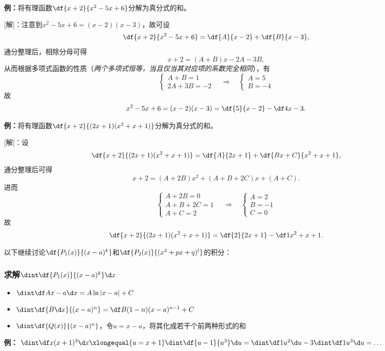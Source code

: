 {\bf 例：}将有理函数$\df{x+2}{x^2-5x+6}$分解为真分式的和。

[解]：注意到$x^2-5x+6=(x-2)(x-3)$，故可设
$$\df{x+2}{x^2-5x+6}=\df{A}{x-2}+\df{B}{x-3},$$
通分整理后，相除分母可得
$$x+2=(A+B)x-2A-3B,$$
从而根据多项式函数的性质（{\it 两个多项式恒等，当且仅当其对应项的系数完全相同}），有
$$
	\left\{\begin{array}{l}
		A+B=1\\
		2A+3B=-2
	\end{array}\right.
	\quad\Rightarrow\quad
	\left\{\begin{array}{l}
		A=5\\
		B=-4
	\end{array}\right.
$$
故
$$x^2-5x+6=(x-2)(x-3)=\df{5}{x-2}-\df4{x-3}.$$
\fin

{\bf 例：}将有理函数$\df{x+2}{(2x+1)(x^2+x+1)}$分解为真分式的和。

[解]：设
$$\df{x+2}{(2x+1)(x^2+x+1)}
=\df{A}{2x+1}+\df{Bx+C}{x^2+x+1},$$
通分整理后可得
$$x+2=(A+2B)x^2+(A+B+2C)x+(A+C).$$
进而
$$
	\left\{\begin{array}{l}
		A+2B=0\\
		A+B+2C=1\\
		A+C=2
	\end{array}\right.
	\quad\Rightarrow\quad
	\left\{\begin{array}{l}
		A=2\\
		B=-1\\
		C=0
	\end{array}\right.
$$
故
$$\df{x+2}{(2x+1)(x^2+x+1)}
=\df{2}{2x+1}-\df1{x^2+x+1}.$$
\fin

以下继续讨论$\df{P_1(x)}{(x-a)^k}$和$\df{P_2(x)}{(x^2+px+q)^l}$的积分：

\subsubsection{求解$\dint\df{P_1(x)}{(x-a)^k}\d x$}

\begin{thx}
	\begin{itemize}
	  \item $\dint\df A{x-a}\d x=A\ln|x-a|+C$
	  \item $\dint\df{B\d x}{(x-a)^n}=\df B{(1-n)(x-a)^{n-1}}+C$
	  \item $\dint\df{Q(x)}{(x-a)^n}$，令$u=x-a$，将其化成若干个前两种形式的和
	\end{itemize}
\end{thx}

{\bf 例：}
 $\dint\df x{(x+1)^3}\d x\xlongequal{u=x+1}\dint\df{u-1}{u^3}\d u
 =\dint\df1{u^2}\d u-3\dint\df1{u^3}\d u=\ldots$
 
